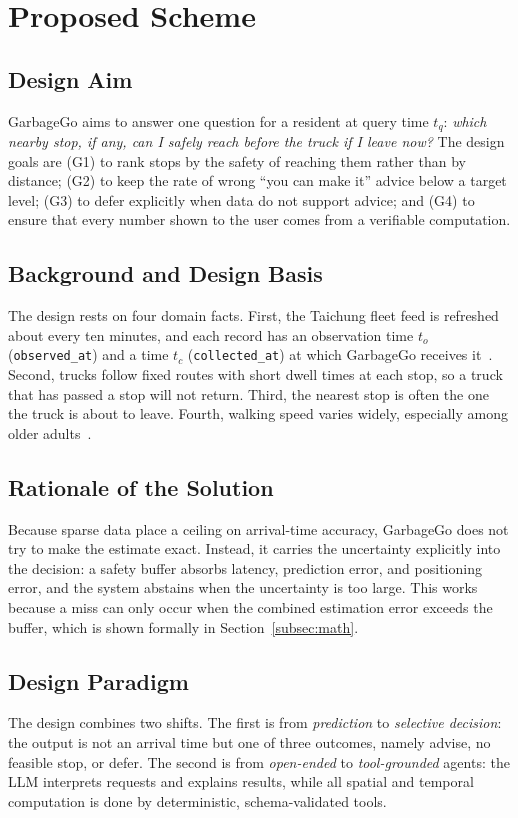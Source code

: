 \section{Proposed Scheme}\label{sec:method}

\subsection{Design Aim}
GarbageGo aims to answer one question for a resident at query time $t_q$: \emph{which nearby stop, if any, can I safely reach before the truck if I leave now?} The design goals are (G1) to rank stops by the safety of reaching them rather than by distance; (G2) to keep the rate of wrong ``you can make it'' advice below a target level; (G3) to defer explicitly when data do not support advice; and (G4) to ensure that every number shown to the user comes from a verifiable computation.

\subsection{Background and Design Basis}
The design rests on four domain facts. First, the Taichung fleet feed is refreshed about every ten minutes, and each record has an observation time $t_o$ (\texttt{observed\_at}) and a time $t_c$ (\texttt{collected\_at}) at which GarbageGo receives it~\cite{taichung_fleet_api}. Second, trucks follow fixed routes with short dwell times at each stop, so a truck that has passed a stop will not return. Third, the nearest stop is often the one the truck is about to leave. Fourth, walking speed varies widely, especially among older adults~\cite{knoblauch1996}.

\subsection{Rationale of the Solution}
Because sparse data place a ceiling on arrival-time accuracy, GarbageGo does not try to make the estimate exact. Instead, it carries the uncertainty explicitly into the decision: a safety buffer absorbs latency, prediction error, and positioning error, and the system abstains when the uncertainty is too large. This works because a miss can only occur when the combined estimation error exceeds the buffer, which is shown formally in Section~\ref{subsec:math}.

\subsection{Design Paradigm}
The design combines two shifts. The first is from \emph{prediction} to \emph{selective decision}: the output is not an arrival time but one of three outcomes, namely advise, no feasible stop, or defer. The second is from \emph{open-ended} to \emph{tool-grounded} agents: the LLM interprets requests and explains results, while all spatial and temporal computation is done by deterministic, schema-validated tools.

